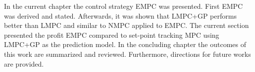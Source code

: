 In the current chapter the control strategy EMPC was presented.
First EMPC was derived and stated.
Afterwards, it was shown that LMPC+GP performs better than LMPC and similar to NMPC applied to EMPC.
The current section presented the profit EMPC compared to set-point tracking MPC using LMPC+GP as the prediction model.
In the concluding chapter the outcomes of this work are summarized and reviewed.
Furthermore, directions for future works are provided.